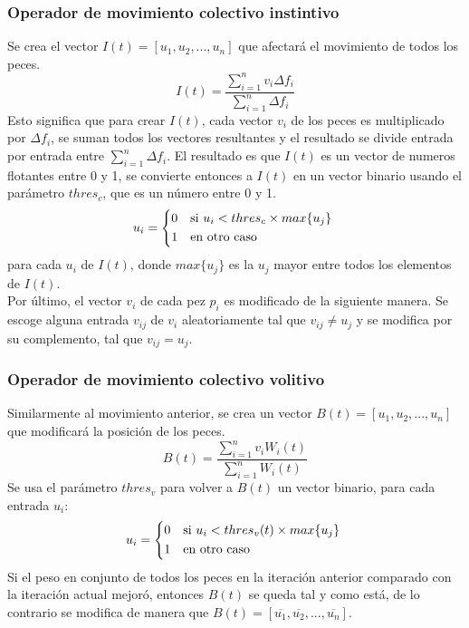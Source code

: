 \documentclass[12pt]{article}
\begin{document}
\subsubsection{Operador de movimiento colectivo instintivo}
Se crea el vector $I(t) = [u_1, u_2,...,u_n]$ que afectará el movimiento de todos los peces.
\begin{equation*}
  I(t) = \frac{\sum_{i=1}^nv_i\Delta f_i}{\sum_{i=1}^n\Delta f_i}
\end{equation*}
Esto significa que para crear $I(t)$, cada vector $v_i$ de los peces es multiplicado por $\Delta f_i$, se suman todos los vectores resultantes y el resultado se divide entrada por entrada entre $\sum_{i=1}^n\Delta f_i$. El resultado es que $I(t)$ es un vector de numeros flotantes entre 0 y 1, se convierte entonces a $I(t)$ en un  vector binario usando el parámetro $thres_c$, que es un número entre 0 y 1.
\begin{equation*}
  u_i =
  \begin{cases*}
    0 & si $u_i < thres_c \times max\{u_j\}$ \\
    1 & en otro caso 
  \end{cases*}
\end{equation*}
para cada $u_i$ de $I(t)$, donde $max\{u_j\}$ es la $u_j$ mayor entre todos los elementos de $I(t)$. \\

Por último, el vector $v_i$ de cada pez $p_i$ es modificado de la siguiente manera. Se escoge alguna entrada $v_{ij}$ de $v_i$ aleatoriamente tal que $v_{ij} \neq u_j$ y se modifica por su complemento, tal que $v_{ij} = u_j$.

\subsubsection{Operador de movimiento colectivo volitivo}
Similarmente al movimiento anterior, se crea un vector $B(t) = [u_1, u_2,...,u_n]$ que modificará la posición de los peces.
\begin{equation*}
  B(t) = \frac{\sum_{i=1}^nv_i W_i(t)}{\sum_{i=1}^n W_i(t)}
\end{equation*}
Se usa el parámetro $thres_v$ para volver a $B(t)$ un vector binario, para cada entrada $u_i$:
\begin{equation*}
  u_i =
  \begin{cases*}
    0 & si $u_i < thres_v(t) \times max\{u_j\}$ \\
    1 & en otro caso 
  \end{cases*}
\end{equation*}
Si el peso en conjunto de todos los peces en la iteración anterior comparado con la iteración actual mejoró, entonces $B(t)$ se queda tal y como está, de lo contrario se modifica de manera que $B(t) = [\overline{u_1}, \overline{u_2},...,\overline{u_n}]$. \\
\end{document}
